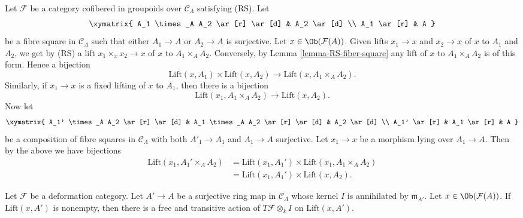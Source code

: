 \begin{remark}
\label{remark-lift-bijections}
Let $\mathcal{F}$ be a category cofibered in groupoids over $\mathcal
C_\Lambda$ satisfying (RS).  Let
$$
\xymatrix{
A_1 \times_A A_2 \ar[r] \ar[d] & A_2 \ar[d] \\
A_1 \ar[r] & A
}
$$
be a fibre square in $\mathcal{C}_\Lambda$ such that either
$A_1 \to A$ or $A_2 \to A$ is surjective. Let
$x \in \Ob(\mathcal{F}(A))$. Given
lifts $x_1 \to x$ and $x_2 \to x$ of $x$ to $A_1$ and $A_2$, we get by
(RS) a lift $x_1 \times_x x_2 \to x$ of $x$ to $A_1 \times_A A_2$.
Conversely, by
Lemma \ref{lemma-RS-fiber-square}
any lift of $x$ to $A_1 \times_A A_2$ is of this form.
Hence a bijection
$$
\text{Lift}(x, A_1) \times \text{Lift}(x, A_2)
\longrightarrow
\text{Lift}(x, A_1 \times_A A_2).
$$
Similarly, if $x_1 \to x$ is a fixed lifting of $x$ to $A_1$, then
there is a bijection
$$
\text{Lift}(x_1, A_1 \times_A A_2)
\longrightarrow
\text{Lift}(x, A_2).
$$
Now let
$$
\xymatrix{
A_1' \times_A A_2 \ar[r] \ar[d] & A_1 \times_A A_2 \ar[r] \ar[d] & A_2
\ar[d] \\
A_1' \ar[r] & A_1 \ar[r] & A
}
$$
be a composition of fibre squares in $\mathcal{C}_\Lambda$ with
both $A'_1 \to A_1$ and $A_1 \to A$ surjective. Let $x_1 \to x$ be a morphism
lying over $A_1 \to A$. Then by the above we have bijections
\begin{align*}
\text{Lift}(x_1, A_1' \times_A A_2)
& = \text{Lift}(x_1, A_1') \times \text{Lift}(x_1, A_1 \times_A A_2) \\
& = \text{Lift}(x_1, A_1') \times \text{Lift}(x, A_2).
\end{align*}
\end{remark}

\begin{lemma}
\label{lemma-free-transitive-action}
Let $\mathcal{F}$ be a deformation category.
Let $A' \to A$ be a surjective ring map in
$\mathcal{C}_\Lambda$ whose kernel $I$ is annihilated
by $\mathfrak m_{A'}$. Let $x \in \Ob(\mathcal{F}(A))$.
If $\text{Lift}(x, A')$ is nonempty,
then there is a free and transitive action of
$T\mathcal{F} \otimes_k I$ on $\text{Lift}(x, A')$.
\end{lemma}

